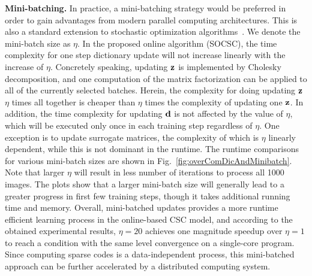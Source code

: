 {\bfseries Mini-batching.} In practice, a mini-batching strategy would be preferred in order to gain advantages from modern parallel computing architectures. This is also a standard extension to stochastic optimization algorithms~\cite{Takac2013, PCDM, SCSG}. We denote the mini-batch size as $\eta$. In the proposed online algorithm (SOCSC), the time complexity for one step dictionary update will not increase linearly with the increase of $\eta$. Concretely speaking, updating $\code$ is implemented by Cholesky decomposition, and one computation of the matrix factorization can be applied to all of the currently selected batches. Herein, the complexity for doing updating $\code$ $\eta$ times all together is cheaper than $\eta$ times the complexity of updating one $\code$. In addition, the time complexity for updating $\filter$ is not affected by the value of $\eta$, which will be executed only once in each training step regardless of $\eta$. One exception is to update surrogate matrices, the complexity of which is $\eta$ linearly dependent, while this is not dominant in the runtime. The runtime comparisons for various mini-batch sizes are shown in Fig.\ \ref{fig:overComDicAndMinibatch}. Note that larger $\eta$ will result in less number of iterations to process all 1000 images. The plots show that a larger mini-batch size will generally lead to a greater progress in first few training steps, though it takes additional running time and memory. Overall, mini-batched updates provides a more runtime efficient learning process in the online-based CSC model, and according to the obtained experimental results, $\eta=20$ achieves one magnitude speedup over $\eta=1$ to reach a condition with the same level convergence on a single-core program. Since computing sparse codes is a data-independent process, this mini-batched approach can be further accelerated by a distributed computing system.
